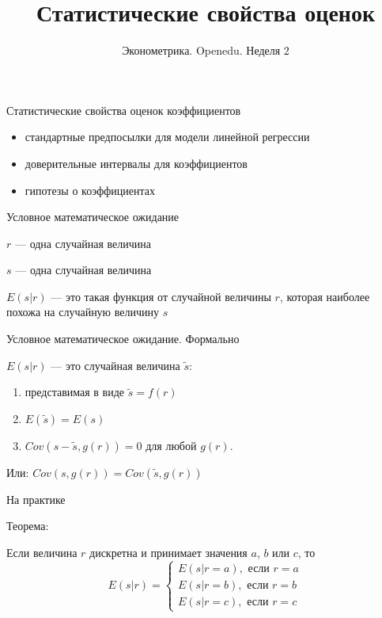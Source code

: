 \documentclass[russian,ignorenonframetext,]{beamer}
\author[Эконометрика. Неделя 2/15]{Эконометрика. Openedu. Неделя 2}
\title{Статистические свойства оценок}
\date{}
\begin{document}
\frame{\titlepage}

\begin{frame}{Статистические свойства оценок коэффициентов}

\begin{itemize}
\item
  стандартные предпосылки для модели линейной регрессии
\item
  доверительные интервалы для коэффициентов
\item
  гипотезы о коэффициентах
\end{itemize}

\end{frame}

\begin{frame}{Условное математическое ожидание}

\(r\) --- одна случайная величина

\(s\) --- одна случайная величина

\(E(s|r)\) --- это такая функция от случайной величины \(r\), которая
наиболее похожа на случайную величину \(s\)

\end{frame}

\begin{frame}{Условное математическое ожидание. Формально}

\(E(s|r)\) --- это случайная величина \(\tilde{s}\):

\begin{enumerate}
\def\labelenumi{\arabic{enumi}.}
\item
  представимая в виде \(\tilde{s}=f(r)\)
\item
  \(E(\tilde{s})=E(s)\)
\item
  \(Cov(s-\tilde{s},g(r))=0\) для любой \(g(r)\).
\end{enumerate}

Или: \(Cov(s,g(r))=Cov(\tilde{s},g(r))\)

\end{frame}

\begin{frame}{На практике}

Теорема:

Если величина \(r\) дискретна и принимает значения \(a\), \(b\) или
\(c\), то \[
E(s|r)=\begin{cases}
E(s|r=a), \text{ если } r=a \\
E(s|r=b), \text{ если } r=b \\
E(s|r=c), \text{ если } r=c
\end{cases}
\]

\end{frame}
\end{document}
